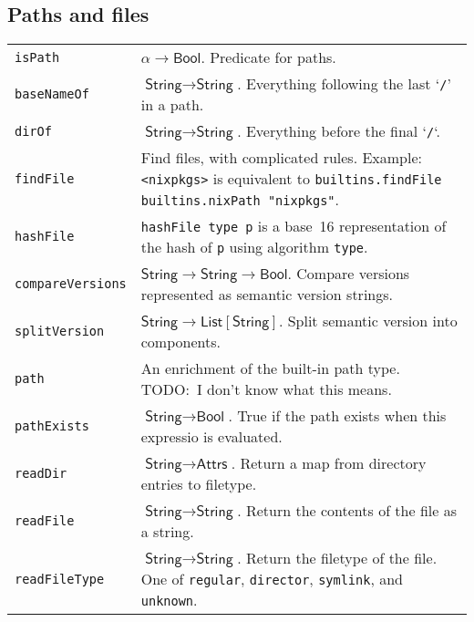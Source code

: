 \documentclass[9pt, a4paper, landscape]{extarticle}
\newcommand{\cmd}[1]{\texttt{#1}}
\newcommand{\str}{\textsf{String}}
\newcommand{\lst}{\textsf{List}}
\newcommand{\ats}{\textsf{Attrs}}
\newcommand{\bln}{\textsf{Bool}}
\begin{document}
\begin{multicols*}{3}
\begin{tabularx}{\columnwidth}{@{}l>{\raggedright\arraybackslash}X@{}}
\end{tabularx}


\subsection{Paths and files}
\begin{tabularx}{\columnwidth}{@{}l>{\raggedright\arraybackslash}X@{}}
  \cmd{isPath} & $\alpha\to\bln$. Predicate for paths. \\

  \cmd{baseNameOf} & $\str\to\str$. Everything following the last
  `\cmd{/}' in a path. \\

  \cmd{dirOf} & $\str\to\str$. Everything before the final `\cmd{/}`. \\
  
  \cmd{findFile} & Find files, with complicated rules. Example:
                   \cmd{<nixpkgs>} is equivalent to
                   \cmd{builtins.findFile builtins.nixPath
                   "nixpkgs"}. \\
  
  \cmd{hashFile} & \cmd{hashFile type p} is a base~16 representation
                   of the hash of \cmd{p} using algorithm \cmd{type}. \\
  
  \cmd{compareVersions} & $\str\to\str\to\bln$. Compare versions
  represented as semantic version strings. \\
  
  \cmd{splitVersion} & $\str\to\lst[\str]$. Split semantic version into
  components. \\

  \cmd{path} & An enrichment of the built-in path type. TODO:\ I don't
               know what this means.  \\
  \cmd{pathExists} & $\str\to\bln$. True if the path exists when this
                     expressio is evaluated. \\
  \cmd{readDir} & $\str\to\ats$. Return a map from directory entries to
                  filetype. \\
  \cmd{readFile} & $\str\to\str$. Return the contents of the file as a
                   string. \\
  \cmd{readFileType} & $\str\to\str$. Return the filetype of the
                       file. One of \cmd{regular}, \cmd{director},
                       \cmd{symlink}, and \cmd{unknown}. \\


\end{tabularx}
\end{multicols*}
\end{document}
